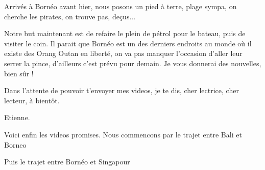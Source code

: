 \begin{multicols}{2}
Arrivés à Bornéo avant hier, nous posons un pied à terre, plage sympa, on cherche les pirates, on trouve pas, deçus...

Notre but maintenant est de refaire le plein de pétrol pour le bateau, puis de visiter le coin. Il parait que Bornéo est un des derniers endroits au monde où il existe des Orang Outan en liberté, on va pas manquer l'occasion d'aller leur serrer la pince, d'ailleurs c'est prévu pour demain. Je vous donnerai des nouvelles, bien sûr !

Dans l'attente de pouvoir t'envoyer mes videos, je te dis, cher lectrice, cher lecteur, à bientôt.

Etienne.

Voici enfin les videos promises. Nous commencons par le trajet entre Bali et Borneo



Puis le trajet entre Bornéo et Singapour



\end{multicols}


